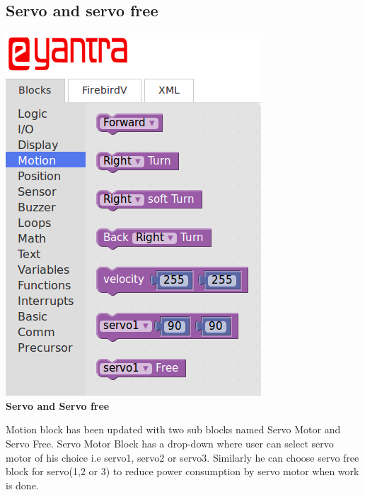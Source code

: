 \documentclass[a4paper,12pt,oneside]{book}
\begin{document}
\subsection{Servo and servo free}    
    \begin{center}
    \includegraphics[scale =0.6]{servob}\\[.3in]
    \textbf{Servo and Servo free}\\[1.3in]
    \end{center}
    Motion block has been updated with two sub blocks named Servo Motor and Servo Free. Servo Motor Block has a drop-down where user can select servo motor of his choice i.e servo1, servo2 or servo3. Similarly he can choose servo free block for servo(1,2 or 3) to reduce power consumption by servo motor when work is done.
\end{document}
